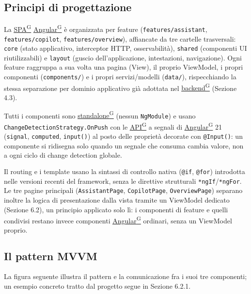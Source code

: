 \documentclass[a4paper,12pt]{article}
\providecommand{\glslink}[2]{\href{https://alittlebyte-19.github.io/Documentazione/glossario.html\#gls-#1}{\underline{#2}\textsuperscript{\scriptsize G}}}
\begin{document}
\begin{sloppypar}

\subsection{Principi di progettazione}

La \glslink{spa-single-page-application}{SPA} \glslink{angular}{Angular} è organizzata per feature (\texttt{features/assistant}, \texttt{features/copilot}, \texttt{features/overview}), affiancate da tre cartelle trasversali: \texttt{core} (stato applicativo, interceptor HTTP, osservabilità), \texttt{shared} (componenti UI riutilizzabili) e \texttt{layout} (guscio dell'applicazione, intestazioni, navigazione). Ogni feature raggruppa a sua volta una pagina (View), il proprio ViewModel, i propri componenti (\texttt{components/}) e i propri servizi/modelli (\texttt{data/}), rispecchiando la stessa separazione per dominio applicativo già adottata nel \glslink{backend}{backend} (Sezione 4.3).

Tutti i componenti sono \glslink{standalone}{standalone} (nessun \texttt{NgModule}) e usano \texttt{ChangeDetectionStrategy.OnPush} con le \glslink{api-application-programming-interface}{API} a segnali di \glslink{angular}{Angular} 21 (\texttt{signal}, \texttt{computed}, \texttt{input()}) al posto delle proprietà decorate con \texttt{@Input()}: un componente si ridisegna solo quando un segnale che consuma cambia valore, non a ogni ciclo di change detection globale.

Il routing e i template usano la sintassi di controllo nativa (\texttt{@if}, \texttt{@for}) introdotta nelle versioni recenti del framework, senza le direttive strutturali \texttt{*ngIf}/\texttt{*ngFor}. Le tre pagine principali (\texttt{AssistantPage}, \texttt{CopilotPage}, \texttt{OverviewPage}) separano inoltre la logica di presentazione dalla vista tramite un ViewModel dedicato (Sezione 6.2), un principio applicato solo lì: i componenti di feature e quelli condivisi restano invece componenti \glslink{angular}{Angular} ordinari, senza un ViewModel proprio.

\subsection{Il pattern MVVM}

La figura seguente illustra il pattern e la comunicazione fra i suoi tre componenti; un esempio concreto tratto dal progetto segue in Sezione 6.2.1.


\end{sloppypar}
\end{document}
